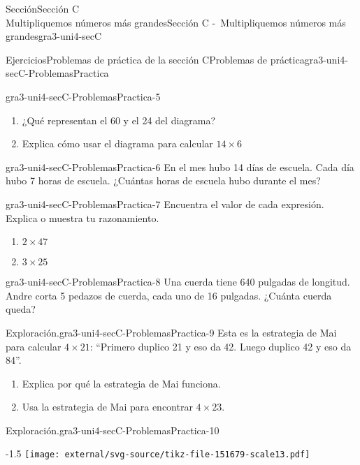 \begin{sectionptx}{Sección}{{\Large Sección C\\}Multipliquemos números más grandes}{}{Sección C -~Multipliquemos números más grandes}{}{}{gra3-uni4-secC}
\begin{exercises-subsection}{Ejercicios}{Problemas de práctica de la sección C}{}{Problemas de práctica}{}{}{gra3-uni4-secC-ProblemasPractica}
\begin{divisionexercise}{3}{}{}{gra3-uni4-secC-ProblemasPractica-5}
\begin{sidebyside}{2}{0.0125}{0.0125}{0.025}
\begin{sbspanel}{0.6}%
%
\begin{enumerate}[label={(\alph*)}]
\item{}¿Qué representan el 60 y el 24 del diagrama?%
\item{}Explica cómo usar el diagrama para calcular \(14 \times 6\)%
\end{enumerate}
\end{sbspanel}%
\end{sidebyside}%
\end{divisionexercise}%
\begin{divisionexercise}{4}{}{}{gra3-uni4-secC-ProblemasPractica-6}%
En el mes hubo 14 días de escuela. Cada día hubo 7 horas de escuela. ¿Cuántas horas de escuela hubo durante el mes?%
\end{divisionexercise}%
\begin{divisionexercise}{5}{}{}{gra3-uni4-secC-ProblemasPractica-7}%
Encuentra el valor de cada expresión. Explica o muestra tu razonamiento.%
%
\begin{enumerate}[label={(\alph*)}]
\item{}\(\displaystyle 2 \times 47\)%
\item{}\(\displaystyle 3 \times 25\)%
\end{enumerate}
\end{divisionexercise}%
\begin{divisionexercise}{6}{}{}{gra3-uni4-secC-ProblemasPractica-8}%
Una cuerda tiene 640 pulgadas de longitud. Andre corta 5 pedazos de cuerda, cada uno de 16 pulgadas. ¿Cuánta cuerda queda?%
\end{divisionexercise}%
\begin{divisionexercise}{7}{Exploración.}{}{gra3-uni4-secC-ProblemasPractica-9}%
Esta es la estrategia de Mai para calcular \(4 \times 21\): “Primero duplico 21 y eso da 42. Luego duplico 42 y eso da 84”.%
%
\begin{enumerate}[label={(\alph*)}]
\item{}Explica por qué la estrategia de Mai funciona.%
\item{}Usa la estrategia de Mai para encontrar \(4 \times 23\).%
\end{enumerate}
\end{divisionexercise}%
\begin{divisionexercise}{8}{Exploración.}{}{gra3-uni4-secC-ProblemasPractica-10}%
\begin{image}{0}{1}{0}{-1.5\baselineskip}%
\texttt{[image: external/svg-source/tikz-file-151679-scale13.pdf]}

\end{image}
\end{divisionexercise}
\end{exercises-subsection}
\end{sectionptx}
